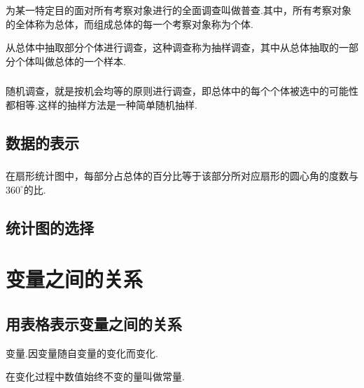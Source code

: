 \documentclass[fontset=windows]{ctexrep}
\begin{document}
\subsection{}
\par 为某一特定目的面对所有考察对象进行的全面调查叫做{\heiti 普查}.其中，所有考察对象的全体称为{\heiti 总体}，而组成总体的每一个考察对象称为{\heiti 个体}.
\par 从总体中抽取部分个体进行调查，这种调查称为{\heiti 抽样调查}，其中从总体抽取的一部分个体叫做总体的一个{\heiti 样本}.
\subsection{}
\par 随机调查，就是按机会均等的原则进行调查，即总体中的每个个体被选中的可能性都相等.这样的抽样方法是一种简单随机抽样.
\section{数据的表示}
\subsection{}
\par 在扇形统计图中，每部分占总体的百分比等于该部分所对应扇形的圆心角的度数与$360^\circ$的比.
\subsection{}
\subsection{}
\subsection{}
\section{统计图的选择}
\subsection{}
\subsection{}
\chapter{变量之间的关系}
\section{用表格表示变量之间的关系}
\par {\heiti 变量}.{\heiti 因变量}随{\heiti 自变量}的变化而变化.
\par 在变化过程中数值始终不变的量叫做{\heiti 常量}.
\end{document}
